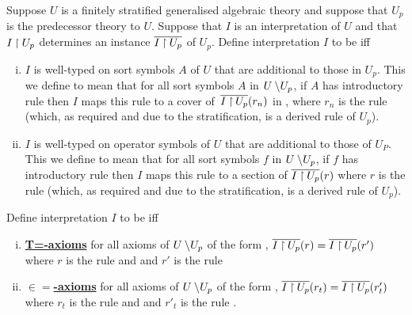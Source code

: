 \begin{definition}
Suppose $U$ is a finitely stratified generalised algebraic theory and 
suppose that $U_p$ is the predecessor theory to $U$. Suppose that $I$ is an interpretation of $U$  and that  $I \mathbin{\restriction} U_p$  
determines an instance $\overline{I \mathbin{\restriction} U_p}$ of $U_p$.
Define interpretation $I$ to be   iff 

\begin{enumerate}[(i)]
\item
$I$ is well-typed on sort symbols $A$ of $U$ that are additional to those in $U_p$. This we define to mean that
for all sort symbols $A$ in $U \setminus\kern-2pt U_p$, if $A$ has introductory rule 
\genericAintroductoryrule then $I$ maps this rule to a cover of \,$\overline{I \mathbin{\restriction} U_p}(r_n)$ in \catc, where $r_n$ is the rule 
 (which, as required and due to the stratification, is a derived rule of $U_p$).
\item  $I$ is well-typed on operator symbols  of $U$ that are additional to those of $U_P$. This we define to mean that
for all sort symbols $f$ in $U \setminus\kern-2pt U_p$, if $f$ has introductory rule 
\genericfintroductoryrule then $I$ maps this rule to a section 
of $\overline{I \mathbin{\restriction} U_p}(r)$ where $r$ is the rule
 (which, as required and due to the stratification, is a derived rule of $U_p$). 
\end{enumerate}

Define interpretation $I$ to be   iff  
\begin{enumerate}[(i)]
\item \underline{\textbf{T=-axioms}} 
for all axioms of $U \setminus\kern-2pt U_p$ of the form
 ,
$\overline{I \mathbin{\restriction} U_p}(r) = \overline{I \mathbin{\restriction} U_p}(r')$ where $r$ is the rule
 and  
and $r'$ is the rule 
\item \underline{\textbf{$\boldsymbol{\in=}$-axioms}} 
for all axioms of $U \setminus\kern-2pt U_p$ of the form 
,
$\overline{I \mathbin{\restriction} U_p}(r_t) = \overline{I \mathbin{\restriction} U_p}(r'_t)$ where $r_t$ is the rule
 and  
and $r'_t$ is the rule .
\end{enumerate}
\end{definition}

